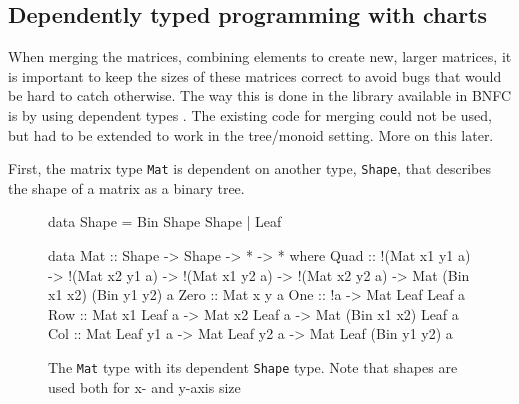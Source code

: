 \documentclass[a4paper,12pt,twosided]{report}
\renewcommand\cite{\citep}
\begin{document}
\subsection{Dependently typed programming with charts}
When merging the matrices, combining elements to create new, larger matrices, it
is important to keep the sizes of these matrices correct to avoid bugs that
would be hard to catch otherwise. The way this is done in the library available
in BNFC is by using dependent types \cite{jyp-bnfc}. The existing code for
merging could not be used, but had to be extended to work in the tree/monoid
setting. More on this later.

First, the matrix type \texttt{Mat} is dependent on another type,
\texttt{Shape}, that describes the shape of a matrix as a binary tree.

\begin{figure}[H]
\begin{code}
data Shape = Bin Shape Shape | Leaf

data Mat :: Shape -> Shape -> * -> * where
  Quad :: !(Mat x1 y1 a) -> !(Mat x2 y1 a) ->
          !(Mat x1 y2 a) -> !(Mat x2 y2 a) ->
          Mat (Bin x1 x2) (Bin y1 y2) a
  Zero :: Mat x y a
  One :: !a -> Mat Leaf Leaf a
  Row :: Mat x1 Leaf a -> Mat x2 Leaf a -> Mat (Bin x1 x2) Leaf a
  Col :: Mat Leaf y1 a -> Mat Leaf y2 a -> Mat Leaf (Bin y1 y2) a
\end{code}
\caption{\label{mat}The \texttt{Mat} type with its dependent \texttt{Shape}
type. Note that shapes are used both for x- and y-axis size}
\end{figure}
\end{document}

